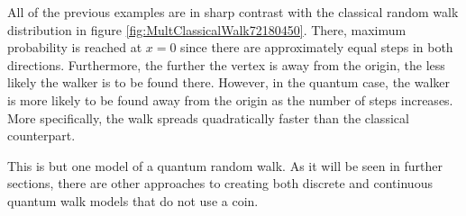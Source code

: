 \documentclass[../../dissertation.tex]{subfiles}
\begin{document}
All of the previous examples are in sharp contrast with the classical random walk distribution in figure \ref{fig:MultClassicalWalk72180450}. There, maximum probability is reached at $x=0$ since there are approximately equal steps in both directions. Furthermore, the further the vertex is away from the origin, the less likely the walker is to be found there. However, in the quantum case, the walker is more likely to be found away from the origin as the number of steps increases. More specifically, the walk spreads quadratically faster than the classical counterpart.\par
This is but one model of a quantum random walk. As it will be seen in further sections, there are other approaches to creating both discrete and continuous quantum walk models that do not use a coin. 


\end{document}
